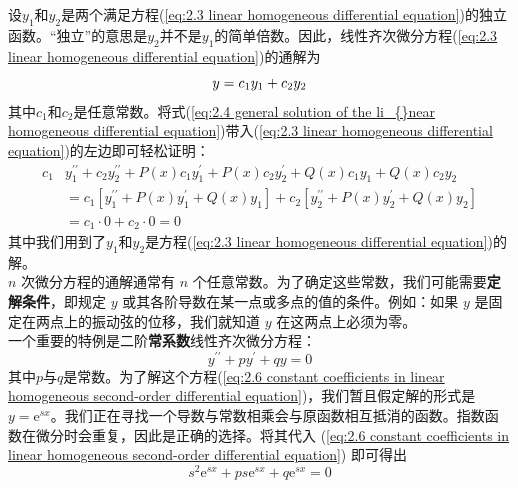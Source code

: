 	设$y_1$和$y_2$是两个满足方程(\ref{eq:2.3 linear homogeneous differential equation})的独立函数。“独立”的意思是$y_2$并不是$y_1$的简单倍数。因此，线性齐次微分方程(\ref{eq:2.3 linear homogeneous differential equation})的通解为
	\begin{equation}
		y = c_1y_1+c_2y_2
		\label{eq:2.4 general solution of the li_{}near homogeneous differential equation}
	\end{equation}
	其中$c_1$和$c_2$是任意常数。将式(\ref{eq:2.4 general solution of the li_{}near homogeneous differential equation})带入(\ref{eq:2.3 linear homogeneous differential equation})的左边即可轻松证明：
	\begin{equation}
		\begin{aligned}
			c_1 & y_1^{\prime\prime}+c_2y_2^{\prime\prime}+P\left(x\right)c_1y_1^{\prime}+P\left(x\right)c_2y_2^{\prime}+Q\left(x\right)c_1y_1+Q\left(x\right)c_2y_2\\
			& = c_1\left[	y_1^{\prime\prime}+P\left(x\right)y_1^{\prime}+Q\left(x\right)y_1\right]+c_2\left[	y_2^{\prime\prime}+P\left(x\right)y_2^{\prime}+Q\left(x\right)y_2\right]\\
			& = c_1 \cdot 0 + c_2 \cdot 0 = 0
		\end{aligned}
		\label{eq:2.5}
	\end{equation}
	其中我们用到了$y_1$和$y_2$是方程(\ref{eq:2.3 linear homogeneous differential equation})的解。\\
	\indent $n$ 次微分方程的通解通常有 $n$ 个任意常数。为了确定这些常数，我们可能需要\textbf{定解条件}，即规定 $y$ 或其各阶导数在某一点或多点的值的条件。例如：如果 $y$ 是固定在两点上的振动弦的位移，我们就知道 $y$ 在这两点上必须为零。\\
	\indent 一个重要的特例是二阶\textbf{常系数}线性齐次微分方程：
	\begin{equation}
		y^{\prime\prime}+py^{\prime}+qy=0
		\label{eq:2.6 constant coefficients in linear homogeneous second-order differential equation}
	\end{equation}
	其中$p$与$q$是常数。为了解这个方程(\ref{eq:2.6 constant coefficients in linear homogeneous second-order differential equation})，我们暂且假定解的形式是$y = \mathrm{e}^{sx}$。我们正在寻找一个导数与常数相乘会与原函数相互抵消的函数。指数函数在微分时会重复，因此是正确的选择。将其代入 (\ref{eq:2.6 constant coefficients in linear homogeneous second-order differential equation}) 即可得出
	\begin{equation*}
		s^2\mathrm{e}^{sx}+ps\mathrm{e}^{sx}+q\mathrm{e}^{sx}=0
	\end{equation*}

